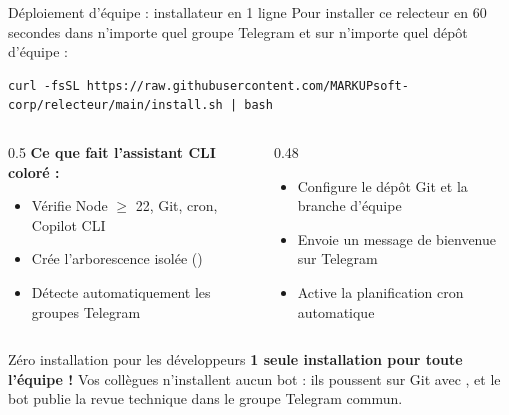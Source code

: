 \documentclass[aspectratio=169,10pt,t]{beamer}
\begin{document}
\begin{frame}[fragile]{D\'eploiement d'\'equipe : installateur en 1 ligne}
Pour installer ce relecteur en 60 secondes dans n'importe quel groupe Telegram et sur n'importe quel d\'ep\^ot d'\'equipe :
\begin{lstlisting}[style=term]
curl -fsSL https://raw.githubusercontent.com/MARKUPsoft-corp/relecteur/main/install.sh | bash
\end{lstlisting}
\begin{columns}[T]\begin{column}{0.5\textwidth}
\textbf{Ce que fait l'assistant CLI color\'e :}
\begin{itemize}
\item V\'erifie Node $\ge$ 22, Git, cron, Copilot CLI
\item Cr\'ee l'arborescence isol\'ee ()
\item D\'etecte automatiquement les groupes Telegram
\end{itemize}
\end{column}\begin{column}{0.48\textwidth}
\begin{itemize}
\item Configure le d\'ep\^ot Git et la branche d'\'equipe
\item Envoie un message de bienvenue sur Telegram
\item Active la planification cron automatique
\end{itemize}
\end{column}\end{columns}
\begin{exampleblock}{Z\'ero installation pour les d\'eveloppeurs}
\textbf{1 seule installation pour toute l'\'equipe !} Vos coll\`egues n'installent aucun bot : ils poussent sur Git avec , et le bot publie la revue technique dans le groupe Telegram commun.
\end{exampleblock}
\end{frame}
\end{document}
